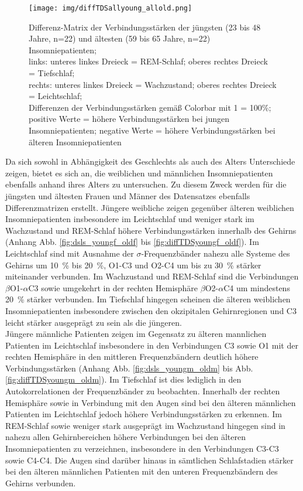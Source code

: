 \begin{figure}[H]
	\centering
	\texttt{[image: img/diffTDSallyoung\_allold.png]}
	\caption[Differenz-Matrix der Verbindungsstärken der jungen und älteren Insomniepatienten]{Differenz-Matrix der Verbindungsstärken der jüngsten (23 bis 48 Jahre, n=22) und ältesten (59 bis 65 Jahre, n=22) Insomniepatienten;\\links: unteres linkes Dreieck = REM-Schlaf; oberes rechtes Dreieck = Tiefschlaf;\\rechts: unteres linkes Dreieck = Wachzustand; oberes rechtes Dreieck = Leichtschlaf;\\Differenzen der Verbindungsstärken gemäß Colorbar mit 1 = 100\%;\\positive Werte = höhere Verbindungsstärken bei jungen Insomniepatienten; negative Werte = höhere Verbindungsstärken bei älteren Insomniepatienten}
	\label{fig:diffTDSallyoung_allold}
\end{figure}

Da sich sowohl in Abhängigkeit des Geschlechts als auch des Alters Unterschiede zeigen, bietet es sich an, die weiblichen und männlichen Insomniepatienten ebenfalls anhand ihres Alters zu untersuchen. Zu diesem Zweck werden für die jüngsten und ältesten Frauen und Männer des Datensatzes ebenfalls Differenzmatrizen erstellt. Jüngere weibliche zeigen gegenüber älteren weiblichen Insomniepatienten insbesondere im Leichtschlaf und weniger stark im Wachzustand und \acs{REM}-Schlaf höhere Verbindungsstärken innerhalb des Gehirns (Anhang Abb. \ref{fig:dsls_youngf_oldf} bis \ref{fig:diffTDSyoungf_oldf}). Im Leichtschlaf sind mit Ausnahme der $\sigma$-Frequenzbänder nahezu alle Systeme des Gehirns um 10~\% bis 20~\%, O1-C3 und O2-C4 um bis zu 30~\% stärker miteinander verbunden. Im Wachzustand und \acs{REM}-Schlaf sind die Verbindungen $\beta$O1-$\alpha$C3 sowie umgekehrt in der rechten Hemisphäre $\beta$O2-$\alpha$C4 um mindestens 20~\% stärker verbunden. Im Tiefschlaf hingegen scheinen die älteren weiblichen Insomniepatienten insbesondere zwischen den okzipitalen Gehirnregionen und C3 leicht stärker ausgeprägt zu sein als die jüngeren.\\

Jüngere männliche Patienten zeigen im Gegensatz zu älteren mannlichen Patienten im Leichtschlaf insbesondere in den Verbindungen C3 sowie O1 mit der rechten Hemisphäre in den mittleren Frequenzbändern deutlich höhere Verbindungsstärken (Anhang Abb. \ref{fig:dsls_youngm_oldm} bis Abb. \ref{fig:diffTDSyoungm_oldm}). Im Tiefschlaf ist dies lediglich in den Autokorrelationen der Frequenzbänder zu beobachten. Innerhalb der rechten Hemisphäre sowie in Verbindung mit den Augen sind bei den älteren männlichen Patienten im Leichtschlaf jedoch höhere Verbindungsstärken zu erkennen. Im \acs{REM}-Schlaf sowie weniger stark ausgeprägt im Wachzustand hingegen sind in nahezu allen Gehirnbereichen höhere Verbindungen bei den älteren Insomniepatienten zu verzeichnen, insbesondere in den Verbindungen C3-C3 sowie C4-C4. Die Augen sind darüber hinaus in sämtlichen Schlafstadien stärker bei den älteren männlichen Patienten mit den unteren Frequenzbändern des Gehirns verbunden.\\

